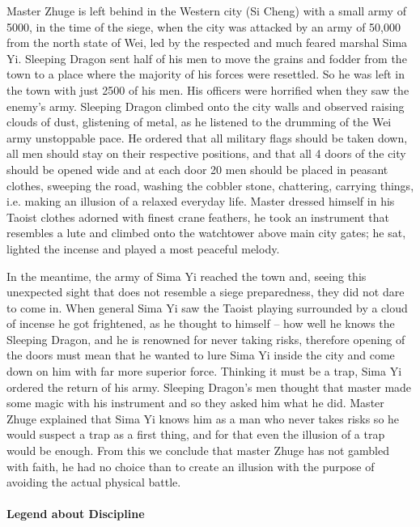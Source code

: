 Master Zhuge is left behind in the Western city (Si Cheng) with a small army of 5000, in the time of the siege, when the city was attacked by an army of 50,000 from the north state of Wei, led by the respected and much feared marshal Sima Yi. Sleeping Dragon sent half of his men to move the grains and fodder from the town to a place where the majority of his forces were resettled. So he was left in the town with just 2500 of his men. His officers were horrified when they saw the enemy's army. Sleeping Dragon climbed onto the city walls and observed raising clouds of dust, glistening of metal, as he listened to the drumming of the Wei army unstoppable pace. He ordered that all military flags should be taken down, all men should stay on their respective positions, and that all 4 doors of the city should be opened wide and at each door 20 men should be placed in peasant clothes, sweeping the road, washing the cobbler stone, chattering, carrying things, i.e. making an illusion of a relaxed everyday life. Master dressed himself in his Taoist clothes adorned with finest crane feathers, he took an instrument that resembles a lute and climbed onto the watchtower above main city gates; he sat, lighted the incense and played a most peaceful melody.

In the meantime, the army of Sima Yi reached the town and, seeing this unexpected sight that does not resemble a siege preparedness, they did not dare to come in. When general Sima Yi saw the Taoist playing surrounded by a cloud of incense he got frightened, as he thought to himself -- how well he knows the Sleeping Dragon, and he is renowned for never taking risks, therefore opening of the doors must mean that he wanted to lure Sima Yi inside the city and come down on him with far more superior force. Thinking it must be a trap, Sima Yi ordered the return of his army. Sleeping Dragon's men thought that master made some magic with his instrument and so they asked him what he did. Master Zhuge explained that Sima Yi knows him as a man who never takes risks so he would suspect a trap as a first thing, and for that even the illusion of a trap would be enough. From this we conclude that master Zhuge has not gambled with faith, he had no choice than to create an illusion with the purpose of avoiding the actual physical battle.

\paragraph{Legend about Discipline}


